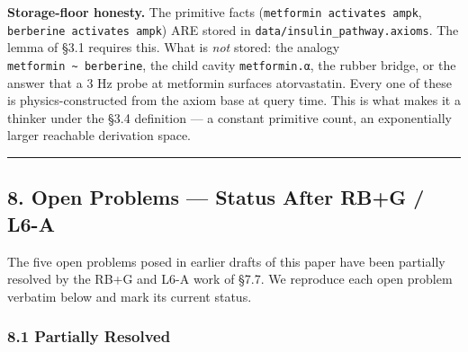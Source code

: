 \documentclass[
  11pt,
  a4paper,
]{article}
\begin{document}
\textbf{Storage-floor honesty.} The primitive facts
(\texttt{metformin\ activates\ ampk},
\texttt{berberine\ activates\ ampk}) ARE stored in
\texttt{data/insulin\_pathway.axioms}. The lemma of §3.1 requires this.
What is \emph{not} stored: the analogy
\texttt{metformin\ \textasciitilde{}\ berberine}, the child cavity
\texttt{metformin.α}, the rubber bridge, or the answer that a 3 Hz probe
at metformin surfaces atorvastatin. Every one of these is
physics-constructed from the axiom base at query time. This is what
makes it a thinker under the §3.4 definition --- a constant primitive
count, an exponentially larger reachable derivation space.

\begin{center}\rule{0.5\linewidth}{0.5pt}\end{center}

\subsection{8. Open Problems --- Status After RB+G /
L6-A}\label{open-problems-status-after-rbg-l6-a}

The five open problems posed in earlier drafts of this paper have been
partially resolved by the RB+G and L6-A work of §7.7. We reproduce each
open problem verbatim below and mark its current status.

\subsubsection{8.1 Partially Resolved}\label{partially-resolved}
\end{document}
